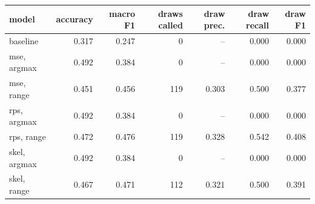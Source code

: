 
\begin{tabular}{lrrrrrr}
\toprule
model & accuracy & macro F1 & draws called & draw prec. & draw recall & draw F1\\
\midrule
baseline & 0.317 & 0.247 & 0 & -- & 0.000 & 0.000\\
mse, argmax & 0.492 & 0.384 & 0 & -- & 0.000 & 0.000\\
mse, range & 0.451 & 0.456 & 119 & 0.303 & 0.500 & 0.377\\
rps, argmax & 0.492 & 0.384 & 0 & -- & 0.000 & 0.000\\
rps, range & 0.472 & 0.476 & 119 & 0.328 & 0.542 & 0.408\\
skel, argmax & 0.492 & 0.384 & 0 & -- & 0.000 & 0.000\\
skel, range & 0.467 & 0.471 & 112 & 0.321 & 0.500 & 0.391\\
\bottomrule
\end{tabular}

